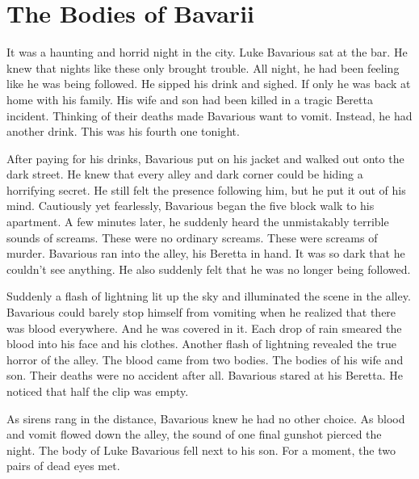 \chapter{The Bodies of Bavarii}


It was a haunting and horrid night in the city. Luke Bavarious sat
at the bar. He knew that nights like these only brought trouble.
All night, he had been feeling like he was being followed. He
sipped his drink and sighed. If only he was back at home with his
family. His wife and son had been killed in a tragic Beretta
incident. Thinking of their deaths made Bavarious want to vomit.
Instead, he had another drink. This was his fourth one
tonight.



After paying for his drinks, Bavarious put on his jacket and walked
out onto the dark street. He knew that every alley and dark corner
could be hiding a horrifying secret. He still felt the presence
following him, but he put it out of his mind. Cautiously yet
fearlessly, Bavarious began the five block walk to his apartment. A
few minutes later, he suddenly heard the unmistakably terrible
sounds of screams. These were no ordinary screams. These were
screams of murder. Bavarious ran into the alley, his Beretta in
hand. It was so dark that he couldn't see anything. He also
suddenly felt that he was no longer being followed.



Suddenly a flash of lightning lit up the sky and illuminated the
scene in the alley. Bavarious could barely stop himself from
vomiting when he realized that there was blood everywhere. And he
was covered in it. Each drop of rain smeared the blood into his
face and his clothes. Another flash of lightning revealed the true
horror of the alley. The blood came from two bodies. The bodies of
his wife and son. Their deaths were no accident after all.
Bavarious stared at his Beretta. He noticed that half the clip was
empty.



As sirens rang in the distance, Bavarious knew he had no other
choice. As blood and vomit flowed down the alley, the sound of one
final gunshot pierced the night. The body of Luke Bavarious fell
next to his son. For a moment, the two pairs of dead eyes met. 

 






